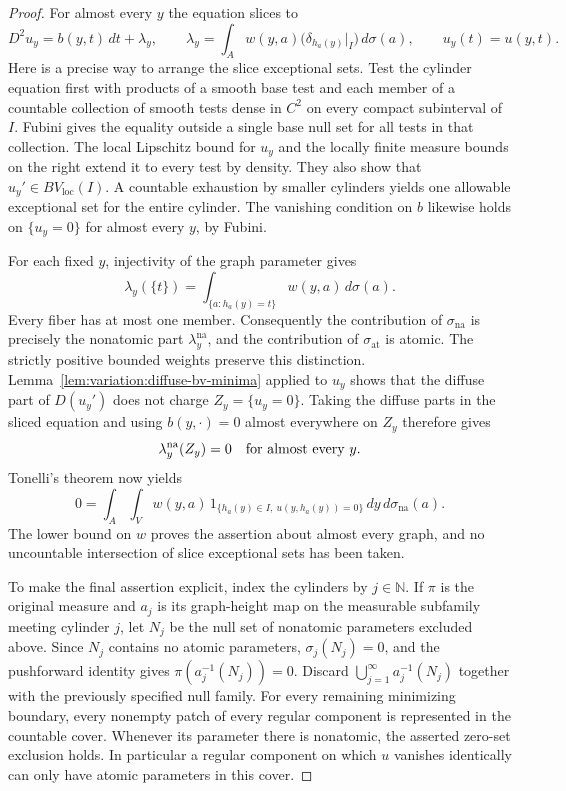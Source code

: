 \begin{proof}
For almost every $y$ the equation slices to
\[
 D^2u_y=b(y,t)\,dt+\lambda_y,
 \qquad
 \lambda_y=\int_Aw(y,a)\bigl(\delta_{h_a(y)}|_I\bigr)\,d\sigma(a),
 \qquad u_y(t)=u(y,t).
\]
Here is a precise way to arrange the slice exceptional sets.
Test the cylinder equation first with products of a smooth base
test and each member of a countable collection of smooth tests dense
in $C^2$ on every compact subinterval of $I$.  Fubini gives the equality outside a
single base null set for all tests in that collection.  The local
Lipschitz bound for $u_y$ and the locally finite measure bounds on
the right extend it to every test by density.  They also show that
$u_y'\in BV_{\mathrm{loc}}(I)$.  A countable exhaustion by smaller
cylinders yields one allowable exceptional set for the entire
cylinder.  The vanishing condition on $b$ likewise holds on
$\{u_y=0\}$ for almost every $y$, by Fubini.

For each fixed $y$, injectivity of the graph parameter gives
\[
 \lambda_y(\{t\})
 =\int_{\{a:h_a(y)=t\}}w(y,a)\,d\sigma(a).
\]
Every fiber has at most one member.  Consequently the contribution
of $\sigma_{\mathrm{na}}$ is precisely the nonatomic part
$\lambda_y^{\mathrm{na}}$, and the contribution of
$\sigma_{\mathrm{at}}$ is atomic.  The strictly positive bounded
weights preserve this distinction.
Lemma~\ref{lem:variation:diffuse-bv-minima} applied to $u_y$ shows
that the diffuse part of $D(u_y')$ does not charge
$Z_y=\{u_y=0\}$.  Taking the diffuse parts in the sliced equation
and using $b(y,\cdot)=0$ almost everywhere on $Z_y$ therefore gives
\[
 \lambda_y^{\mathrm{na}}(Z_y)=0
 \quad\hbox{for almost every }y.
\]
Tonelli's theorem now yields
\[
 0=\int_A\int_V
 w(y,a)\,1_{\{h_a(y)\in I,\ u(y,h_a(y))=0\}}
 \,dy\,d\sigma_{\mathrm{na}}(a).
\]
The lower bound on $w$ proves the assertion about almost every
graph, and no uncountable intersection of slice exceptional sets
has been taken.

To make the final assertion explicit, index the cylinders by
$j\in\mathbb N$.  If $\pi$ is the original measure and
$a_j$ is its graph-height map on the measurable subfamily meeting
cylinder $j$, let $N_j$ be the null set of nonatomic parameters
excluded above.  Since $N_j$ contains no atomic parameters,
$\sigma_j(N_j)=0$, and the pushforward identity gives
$\pi(a_j^{-1}(N_j))=0$.  Discard
$\bigcup_{j=1}^\infty a_j^{-1}(N_j)$ together with the previously
specified null family.  For every remaining minimizing boundary,
every nonempty patch of every regular component is represented in
the countable cover.  Whenever its parameter there is nonatomic,
the asserted zero-set exclusion holds.  In particular a regular
component on which $u$ vanishes identically can only have atomic
parameters in this cover.
\end{proof}


